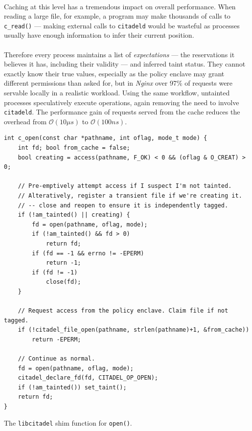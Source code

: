 \paragraph{} Caching at this level has a tremendous impact on overall performance. When reading a large file, for example, a program may make thousands of calls to \texttt{c\_read()} --- making external calls to \texttt{citadeld} would be wasteful as processes usually have enough information to infer their current position.

\paragraph{} Therefore every process  maintains a list of \textit{expectations} --- the reservations it believes it has, including their validity --- and inferred taint status. They cannot exactly know their true values, especially as the policy enclave may grant different permissions than asked for, but in \textit{Nginx} over 97\% of requests were servable locally in a realistic workload. Using the same workflow, untainted processes speculatively execute operations, again removing the need to involve \texttt{citadeld}. The performance gain of requests served from the cache reduces the overhead from $\mathcal{O}(10\mu s)$ to $\mathcal{O}(100ns)$.


\begin{listing}
\begin{verbatim}
int c_open(const char *pathname, int oflag, mode_t mode) {
    int fd; bool from_cache = false;
    bool creating = access(pathname, F_OK) < 0 && (oflag & O_CREAT) > 0;
    
    // Pre-emptively attempt access if I suspect I'm not tainted.
    // Alteratively, register a transient file if we're creating it.
    // -- close and reopen to ensure it is independently tagged.
    if (!am_tainted() || creating) {
        fd = open(pathname, oflag, mode);
        if (!am_tainted() && fd > 0)
            return fd;
        if (fd == -1 && errno != -EPERM)
            return -1;
        if (fd != -1)
            close(fd);
    }

    // Request access from the policy enclave. Claim file if not tagged.
    if (!citadel_file_open(pathname, strlen(pathname)+1, &from_cache))
        return -EPERM;

    // Continue as normal.
    fd = open(pathname, oflag, mode);
    citadel_declare_fd(fd, CITADEL_OP_OPEN);
    if (!am_tainted()) set_taint();
    return fd;
}
\end{verbatim}
\caption{The \texttt{libcitadel} shim function for \texttt{open()}.}
\label{lst:c_open}
\end{listing}

